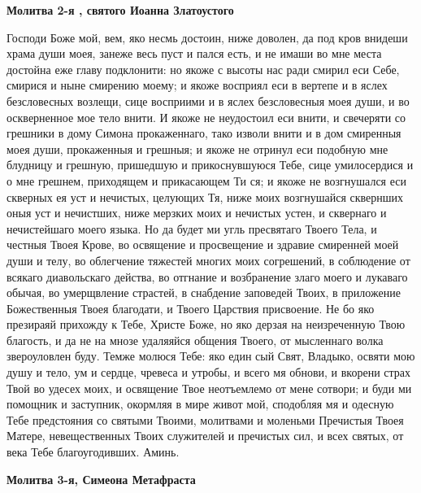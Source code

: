 \bfseries Молитва 2-я , святого Иоанна Златоустого\normalfont{}


Господи Боже мой, вем, яко несмь достоин, ниже доволен, да под кров внидеши храма души моея, занеже весь пуст и пался есть, и не имаши во мне места достойна еже главу подклонити: но якоже с высоты нас ради смирил еси Себе, смирися и ныне смирению моему; и якоже восприял еси в вертепе и в яслех безсловесных возлещи, сице восприими и в яслех безсловесныя моея души, и во оскверненное мое тело внити. И якоже не неудостоил еси внити, и свечеряти со грешники в дому Симона прокаженнаго, тако изволи внити и в дом смиренныя моея души, прокаженныя и грешныя; и якоже не отринул еси подобную мне блудницу и грешную, пришедшую и прикоснувшуюся Тебе, сице умилосердися и о мне грешнем, приходящем и прикасающем Ти ся; и якоже не возгнушался еси скверных ея уст и нечистых, целующих Тя, ниже моих возгнушайся сквернших оныя уст и нечистших, ниже мерзких моих и нечистых устен, и сквернаго и нечистейшаго моего языка. Но да будет ми угль пресвятаго Твоего Тела, и честныя Твоея Крове, во освящение и просвещение и здравие смиренней моей души и телу, во облегчение тяжестей многих моих согрешений, в соблюдение от всякаго диавольскаго действа, во отгнание и возбранение злаго моего и лукаваго обычая, во умерщвление страстей, в снабдение заповедей Твоих, в приложение Божественныя Твоея благодати, и Твоего Царствия присвоение. Не бо яко презираяй прихожду к Тебе, Христе Боже, но яко дерзая на неизреченную Твою благость, и да не на мнозе удаляяйся общения Твоего, от мысленнаго волка звероуловлен буду. Темже молюся Тебе: яко един сый Свят, Владыко, освяти мою душу и тело, ум и сердце, чревеса и утробы, и всего мя обнови, и вкорени страх Твой во удесех моих, и освящение Твое неотъемлемо от мене сотвори; и буди ми помощник и заступник, окормляя в мире живот мой, сподобляя мя и одесную Тебе предстояния со святыми Твоими, молитвами и моленьми Пречистыя Твоея Матере, невещественных Твоих служителей и пречистых сил, и всех святых, от века Тебе благоугодивших. Аминь.




\bfseries Молитва 3-я, Симеона Метафраста\normalfont{}


